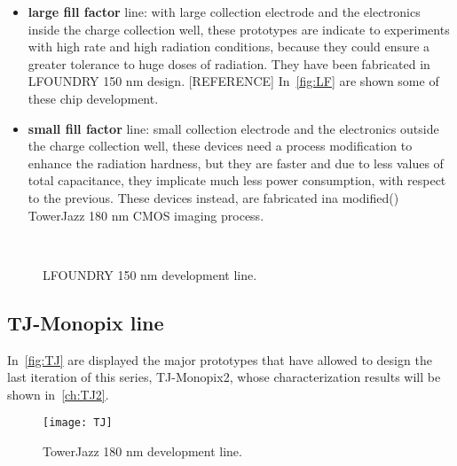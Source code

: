 \begin{itemize}
\item \textbf{large fill factor} line: with large collection electrode and the electronics inside the charge collection well, these prototypes are indicate to experiments with high rate and high radiation conditions, because they could ensure a greater tolerance to huge doses of radiation. They have been fabricated in LFOUNDRY 150 nm design. [REFERENCE] In~\autoref{fig:LF} are shown some of these chip development.
\item \textbf{small fill factor} line: small collection electrode and the electronics outside the charge collection well, these devices need a process modification to enhance the radiation hardness, but they are faster and due to less values of total capacitance, they implicate much less power consumption, with respect to the previous. These devices instead, are fabricated ina modified() TowerJazz 180 nm CMOS imaging process.
\end{itemize}

\begin{figure}[h!]
\centering
\subfigure[CCPD\_LF]
{\texttt{[image: LF1]}}\quad
\subfigure[LF-CPIX]
{\texttt{[image: LF2]}}\quad
\subfigure[LF-MONOPIX 1]
{\texttt{[image: LF3]}}\\
\caption{LFOUNDRY 150 nm development line.}
\label{fig:LF}
\end{figure}


\subsection{TJ-Monopix line}

In~\autoref{fig:TJ} are displayed the major prototypes that have allowed to design the last iteration of this series, TJ-Monopix2, whose characterization results will be shown in~\autoref{ch:TJ2}.

\begin{figure}[h!]
\centering
\texttt{[image: TJ]}
\caption{TowerJazz 180 nm development line.}
\label{fig:TJ}
\end{figure}

